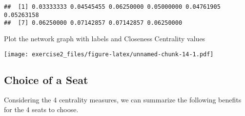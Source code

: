 \documentclass[
]{article}
\newenvironment{Shaded}{\begin{snugshade}}{\end{snugshade}}
\newcommand{\AttributeTok}[1]{\textcolor[rgb]{0.77,0.63,0.00}{#1}}
\newcommand{\DecValTok}[1]{\textcolor[rgb]{0.00,0.00,0.81}{#1}}
\newcommand{\FloatTok}[1]{\textcolor[rgb]{0.00,0.00,0.81}{#1}}
\newcommand{\FunctionTok}[1]{\textcolor[rgb]{0.00,0.00,0.00}{#1}}
\newcommand{\NormalTok}[1]{#1}
\newcommand{\OtherTok}[1]{\textcolor[rgb]{0.56,0.35,0.01}{#1}}
\newcommand{\SpecialCharTok}[1]{\textcolor[rgb]{0.00,0.00,0.00}{#1}}
\newcommand{\StringTok}[1]{\textcolor[rgb]{0.31,0.60,0.02}{#1}}
\begin{document}
\begin{verbatim}
##  [1] 0.03333333 0.04545455 0.06250000 0.05000000 0.04761905 0.05263158
##  [7] 0.06250000 0.07142857 0.07142857 0.06250000
\end{verbatim}

Plot the network graph with labels and Closeness Centrality values

\begin{Shaded}
\end{Shaded}

\texttt{[image: exercise2\_files/figure-latex/unnamed-chunk-14-1.pdf]}

\hypertarget{choice-of-a-seat}{%
\subsection{Choice of a Seat}\label{choice-of-a-seat}}

Considering the 4 centrality measures, we can summarize the following
benefits for the 4 seats to choose.
\end{document}

